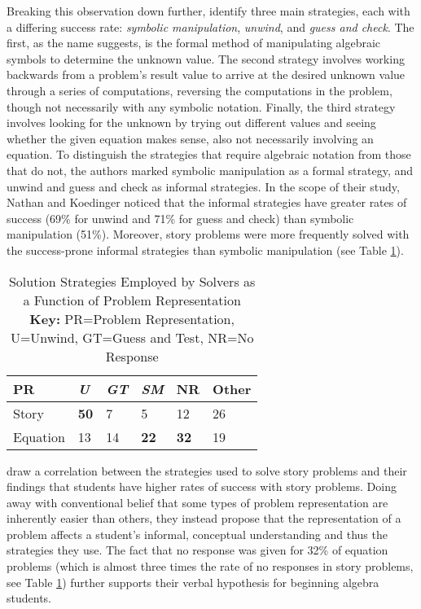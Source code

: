 \documentclass[10pt,letterpaper]{article}
\begin{document}
	Breaking this observation down further,  identify three main strategies, each with a differing success rate: \textit{symbolic manipulation}, \textit{unwind}, and \textit{guess and check}. The first, as the name suggests, is the formal method of manipulating algebraic symbols to determine the unknown value. The second strategy involves working backwards from a problem's result value to arrive at the desired unknown value through a series of computations, reversing the computations in the problem, though not necessarily with any symbolic notation. Finally, the third strategy involves looking for the unknown by trying out different values and seeing whether the given equation makes sense, also not necessarily involving an equation. To distinguish the strategies that require algebraic notation from those that do not, the authors marked symbolic manipulation as a formal strategy, and unwind and guess and check as informal strategies. In the scope of their study, Nathan and Koedinger noticed that the informal strategies have greater rates of success (69\% for unwind and 71\% for guess and check) than symbolic manipulation (51\%). Moreover, story problems were more frequently solved with the success-prone informal strategies than symbolic manipulation (see Table \ref{strategies_employed}). 
	\begin{table}[!ht]
		\begin{center} 
			\caption{Solution Strategies Employed by Solvers as a Function of Problem Representation \cite{KoedNath2004}\\ \textbf{Key:} PR=Problem Representation, U=Unwind, GT=Guess and Test, NR=No Response} 
			\label{strategies_employed} 
			\vskip 0.12in
			\begin{tabular}{llllll} 
				\hline
				PR    &  \textit{U} & \textit{GT} & \textit{SM} & NR & Other \\
				\hline
				Story        &   \textbf{50} & 7 & 5 & 12 & 26\\
				Equation   &   13 & 14 & \textbf{22} & \textbf{32} & 19 \\
				\hline
			\end{tabular} 
		\end{center} 
	\end{table}
	
	 draw a correlation between the strategies used to solve story problems and their findings that students have higher rates of success with story problems. Doing away with conventional belief that some types of problem representation are inherently easier than others, they instead propose that the representation of a problem affects a student's informal, conceptual understanding and thus the strategies they use. The fact that no response was given for 32\% of equation problems (which is almost three times the rate of no responses in story problems, see Table \ref{strategies_employed}) further supports their verbal hypothesis for beginning algebra students.
	
\end{document}
